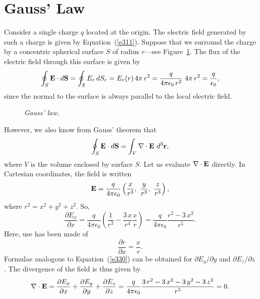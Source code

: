 \section{Gauss' Law}\label{s33}
Consider a single charge $q$ located at the origin. The electric field generated by
such a charge is given by Equation~(\ref{e311}). Suppose that we surround the charge by 
a concentric spherical surface $S$ of radius $r$---see Figure~\ref{f25}.  The flux of the
electric field through this surface is 
given by
\begin{equation}\label{e327}
\oint_S{\bf E}\cdot d{\bf S}= \oint_S  E_r\, dS_r = E_r(r) \, 4\pi \,r^2 =
\frac{q}{4\pi\epsilon_0\,r^2}\,\,4\pi \,r^2 =
 \frac{q}{\epsilon_0},
\end{equation}
since the normal to the surface is always
parallel to the local        electric field.
\begin{figure}
\centerline{}
\caption{\em Gauss' law.}\label{f25}
\end{figure}
However, we also know from Gauss' theorem that
\begin{equation}\label{e328}
\oint_S {\bf E}\cdot d{\bf S} = \int_V \nabla\cdot {\bf E} \,\,d^3{\bf r},
\end{equation}
where $V$ is the volume enclosed by surface $S$. Let us evaluate 
$\nabla\cdot {\bf E}$ directly. In Cartesian coordinates, the field is written
\begin{equation}
{\bf E} = \frac{q}{4\pi\epsilon_0} \left(\frac{x}{r^3},\,\, \frac{y}{r^3},
\,\, \frac{z}{r^3}
\right),
\end{equation}
where $r^2=x^2+y^2+z^2$. So,
\begin{equation}\label{e330}
\frac{\partial E_x}{\partial x} = \frac{q}{4\pi\epsilon_0}\left(
\frac{1}{r^3} - \frac{3\,x}{r^4}\frac{x}{r} \right) =
\frac{q}{4\pi\epsilon_0}\frac{r^2-3\,x^2}{r^5}.
\end{equation}
Here, use has been made of
\begin{equation}
\frac{\partial r}{\partial x} = \frac{x}{r}.
\end{equation}
Formulae analogous to Equation~(\ref{e330}) can be obtained for $\partial E_y/\partial y$ and
 $\partial E_z/\partial z$.
The divergence of the field is thus given by
\begin{equation}\label{e332}
\nabla\cdot {\bf E} = \frac{\partial E_x}{\partial x}+
\frac{\partial E_y}{\partial y}+ \frac{\partial E_z}{\partial z}
= \frac{q}{4\pi\epsilon_0} \frac{3\,r^2 - 3\,x^2-3\,y^2-3\,z^2}{r^5} = 0.
\end{equation}
